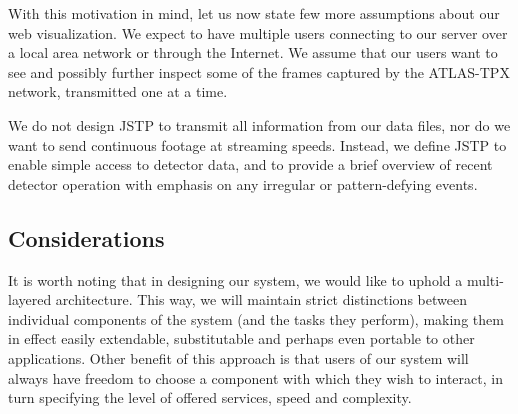 With this motivation in mind, let us now state few more assumptions about our web visualization. We expect to have multiple users connecting to our server over a local area network or through the Internet. We assume that our users want to see and possibly further inspect some of the frames captured by the ATLAS-TPX network, transmitted one at a time.

We do not design JSTP to transmit all information from our data files, nor do we want to send continuous footage at streaming speeds. Instead, we define JSTP to enable simple access to detector data, and to provide a brief overview of recent detector operation with emphasis on any irregular or pattern-defying events.

\subsection{Considerations}
It is worth noting that in designing our system, we would like to uphold a multi-layered architecture. This way, we will maintain strict distinctions between individual components of the system (and the tasks they perform), making them in effect easily extendable, substitutable and perhaps even portable to other applications. Other benefit of this approach is that users of our system will always have freedom to choose a component with which they wish to interact, in turn specifying the level of offered services, speed and complexity.

